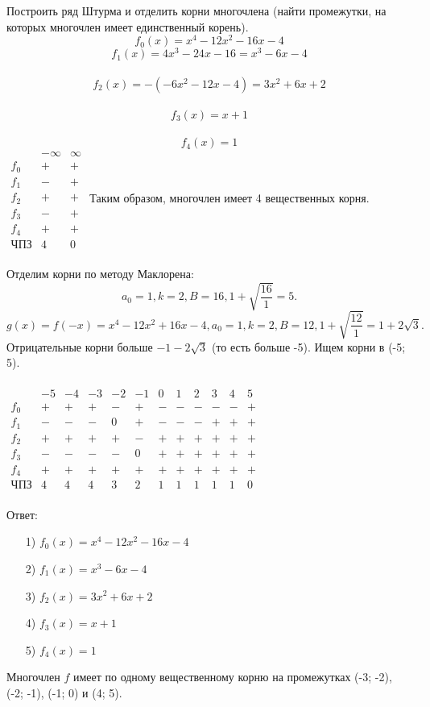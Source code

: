 \documentclass[12pt]{article}
\begin{document}
\begin{examp}
Построить ряд Штурма и отделить корни многочлена (найти промежутки, на которых многочлен имеет единственный корень).
$$f_0(x) = x^4 - 12x^2 - 16x - 4$$
$$f_1(x) = 4x^3 - 24x - 16 = x^3 - 6x - 4$$
\\
$$f_2(x) = -(-6x^2 - 12x - 4) = 3x^2 + 6x + 2$$
\\
$$f_3(x) = x + 1$$
\\
$$f_4(x) = 1$$
$\begin{array}{c|c|c}
               & -\infty & \infty \\ \hline
       f_0  & + & + \\
       f_1 & - & + \\
       f_2 & + & + \\
       f_3 & - & + \\
       f_4 & + & + \\ \hline
     \textit{ЧПЗ} & 4 & 0
\end{array}$
Таким образом, многочлен имеет 4 вещественных корня. \\ \\
\indent Отделим корни по методу Маклорена: $$a_0 = 1, k = 2, B = 16, 1+ \sqrt{\dfrac{16}{1}} = 5.$$
$$g(x) = f(-x) = x^4 - 12x^2 + 16x - 4, a_0 = 1, k = 2, B = 12, 1 + \sqrt{\dfrac{12}{1}} = 1 + 2\sqrt{3}.$$
Отрицательные корни больше $-1 - 2\sqrt{3}$ (то есть больше -5). Ищем корни в (-5; 5). \\ \\
$\begin{array}{c|c|c|c|c|c|c|c|c|c|c|c}
               & -5 & -4 & -3 & -2 & -1 & 0 & 1 & 2 & 3 & 4 & 5 \\ \hline
       f_0 & + & + & + & - & + & - & - & - & - & - & +\\
       f_1 & - & - & - & 0 & + & - & - & - & + & + & +\\ 
       f_2 & + & +  & + & + & - & + & + & + & + & +  & + \\
       f_3 & - & -  & - & - & 0 & + & + & + & + & + & + \\
       f_4 & + & + & + & + & + & + & +  & + & + & + & +\\ \hline
      \textit{ЧПЗ} & 4 & 4 & 4 & 3 & 2 & 1 & 1 & 1 & 1 & 1 & 0
\end{array}$ \\ \\
Ответ:
\begin{itemize}
\item[1)] $f_0(x) = x^4 - 12x^2 - 16x - 4$
\item[2)] $f_1(x) = x^3 - 6x - 4$
\item[3)] $f_2(x) = 3x^2 + 6x + 2$
\item[4)] $f_3(x) = x + 1$
\item[5)] $f_4(x) = 1$
\end{itemize}
\indent  \indent Многочлен $f$ имеет по одному вещественному корню на промежутках (-3; -2), (-2; -1), (-1; 0) и (4; 5).
\end{examp}
\end{document}
